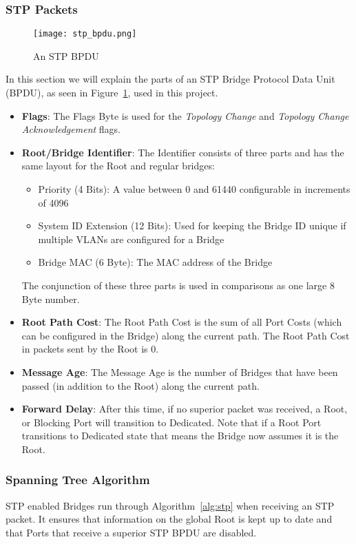 \subsubsection{STP Packets}
\label{stp_packet}
\begin{figure}[h]
    \centering
    \texttt{[image: stp\_bpdu.png]}
    \caption{An STP BPDU}
    \label{fig:stp_bpdu}
\end{figure}
In this section we will explain the parts of an STP Bridge Protocol Data Unit (BPDU), as seen in Figure~\ref{fig:stp_bpdu}, used in this project.
\begin{itemize}
    \item \textbf{Flags}: The Flags Byte is used for the \textit{Topology Change} and \textit{Topology Change Acknowledgement} flags.
    \item \textbf{Root/Bridge Identifier}: The Identifier consists of three parts and has the same layout for the Root and regular bridges:
        \begin{itemize}
            \item Priority (4 Bits): A value between 0 and 61440 configurable in increments of 4096
            \item System ID Extension (12 Bits): Used for keeping the Bridge ID unique if multiple VLANs are configured for a Bridge
            \item Bridge MAC (6 Byte): The MAC address of the Bridge
        \end{itemize}
        The conjunction of these three parts is used in comparisons as one large 8 Byte number.
    \item \textbf{Root Path Cost}: The Root Path Cost is the sum of all Port Costs (which can be configured in the Bridge) along the current path. The Root Path Cost in packets sent by the Root is 0.
    \item \textbf{Message Age}: The Message Age is the number of Bridges that have been passed (in addition to the Root) along the current path.
    \item \textbf{Forward Delay}: After this time, if no superior packet was received, a Root, or Blocking Port will transition to Dedicated.
        Note that if a Root Port transitions to Dedicated state that means the Bridge now assumes it is the Root.
\end{itemize}

\subsubsection{Spanning Tree Algorithm}
STP enabled Bridges run through Algorithm~\ref{alg:stp} when receiving an STP packet.
It ensures that information on the global Root is kept up to date and that Ports that receive a superior STP BPDU are disabled.

